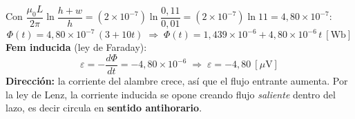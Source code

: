 \documentclass[12pt,letterpaper]{article}
\newcommand{\eps}{\varepsilon}
\begin{document}
\medskip

\noindent Con $\dfrac{\mu_0 L}{2\pi}\ln\dfrac{h+w}{h}
= (2\times10^{-7})\ln\!\dfrac{0{,}11}{0{,}01} = (2\times10^{-7})\ln 11 = 4{,}80\times10^{-7}$:
\[
    \Phi(t) = 4{,}80\times10^{-7}\,(3+10t)
    \;\Rightarrow\;
    \boxed{\Phi(t) = 1{,}439\times10^{-6} + 4{,}80\times10^{-6}\,t\ [\text{Wb}]}
\]
\textbf{Fem inducida} (ley de Faraday):
\[
    \eps = -\frac{d\Phi}{dt} = -4{,}80\times10^{-6}
    \;\Rightarrow\;
    \boxed{\eps = -4{,}80\ [\mu\text{V}]}
\]
\textbf{Direcci\'on:} la corriente del alambre crece, as\'i que el flujo entrante aumenta. Por la
ley de Lenz, la corriente inducida se opone creando flujo \emph{saliente} dentro del lazo, es decir
circula en \textbf{sentido antihorario}.
\end{document}
